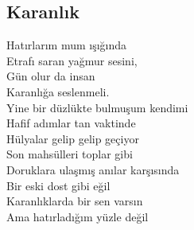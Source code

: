 \subsection{Karanlık}

Hatırlarım mum ışığında \\
Etrafı saran yağmur sesini, \\
Gün olur da insan \\
Karanlığa seslenmeli. \\

\noindent\newline
Yine bir düzlükte bulmuşum kendimi \\
Hafif adımlar tan vaktinde \\
Hülyalar gelip gelip geçiyor \\
Son mahsülleri toplar gibi \\

\noindent\newline
Doruklara ulaşmış anılar karşısında \\
Bir eski dost gibi eğil \\
Karanlıklarda bir sen varsın \\
Ama hatırladığım yüzle değil \\